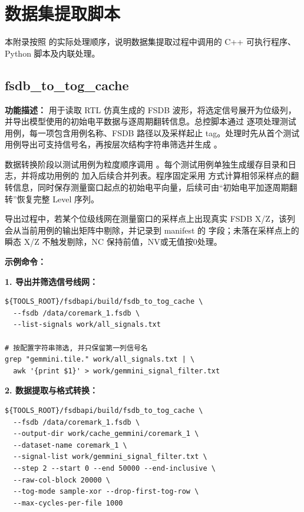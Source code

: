 \chapter{数据集提取脚本}

本附录按照  的实际处理顺序，说明数据集提取过程中调用的 C++ 可执行程序、Python 脚本及内联处理。


\section{fsdb\_to\_tog\_cache}

\textbf{功能描述：} 用于读取 RTL 仿真生成的 FSDB 波形，将选定信号展开为位级列，并导出模型使用的初始电平数据与逐周期翻转信息。总控脚本通过  逐项处理测试用例，每一项包含用例名称、FSDB 路径以及采样起止 tag。处理时先从首个测试用例导出可支持信号名，再按层次结构字符串筛选并生成 。

数据转换阶段以测试用例为粒度顺序调用 。每个测试用例单独生成缓存目录和日志，并将成功用例的  加入后续合并列表。程序固定采用  方式计算相邻采样点的翻转信息，同时保存测量窗口起点的初始电平向量，后续可由“初始电平加逐周期翻转”恢复完整 Level 序列。

导出过程中，若某个位级线网在测量窗口的采样点上出现真实 FSDB X/Z，该列会从当前用例的输出矩阵中剔除，并记录到 manifest 的  字段；未落在采样点上的瞬态 X/Z 不触发剔除，NC 保持前值，NV或无值按0处理。

\textbf{示例命令：}

\textbf{1. 导出并筛选信号线网：}
\begin{lstlisting}
${TOOLS_ROOT}/fsdbapi/build/fsdb_to_tog_cache \
  --fsdb /data/coremark_1.fsdb \
  --list-signals work/all_signals.txt

# 按配置字符串筛选, 并只保留第一列信号名
grep "gemmini.tile." work/all_signals.txt | \
  awk '{print $1}' > work/gemmini_signal_filter.txt
\end{lstlisting}



\textbf{2. 数据提取与格式转换：}
\begin{lstlisting}
${TOOLS_ROOT}/fsdbapi/build/fsdb_to_tog_cache \
  --fsdb /data/coremark_1.fsdb \
  --output-dir work/cache_gemmini/coremark_1 \
  --dataset-name coremark_1 \
  --signal-list work/gemmini_signal_filter.txt \
  --step 2 --start 0 --end 50000 --end-inclusive \
  --raw-col-block 20000 \
  --tog-mode sample-xor --drop-first-tog-row \
  --max-cycles-per-file 1000
\end{lstlisting}

